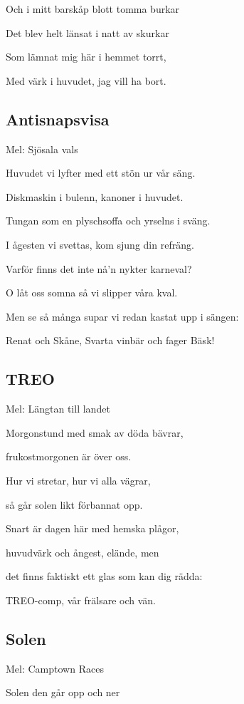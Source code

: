 Och i mitt barskåp blott tomma burkar

Det blev helt länsat i natt av skurkar

Som lämnat mig här i hemmet torrt,

Med värk i huvudet, jag vill ha bort. 


\subsection{\textbf{Antisnapsvisa}}

Mel: Sjösala vals\bigskip


Huvudet vi lyfter med ett stön ur vår säng.

Diskmaskin i bulenn, kanoner i huvudet.

Tungan som en plyschsoffa och yrselns i sväng.

I ågesten vi svettas, kom sjung din refräng.\bigskip


Varför finns det inte nå’n nykter karneval?

O låt oss somna så vi slipper våra kval.

Men se så många supar vi redan kastat upp i sängen:

Renat och Skåne, Svarta vinbär och fager Bäsk!

\subsection{\textbf{TREO}}

Mel: Längtan till landet\bigskip

Morgonstund med smak av döda bävrar,

frukostmorgonen är över oss.

Hur vi stretar, hur vi alla vägrar,

så går solen likt förbannat opp.

Snart är dagen här med hemska plågor,

huvudvärk och ångest, elände, men

det finns faktiskt ett glas som kan dig rädda:

TREO-comp, vår frälsare och vän.

\subsection{\textbf{Solen}}

Mel: Camptown Races\bigskip


Solen den går opp och ner

